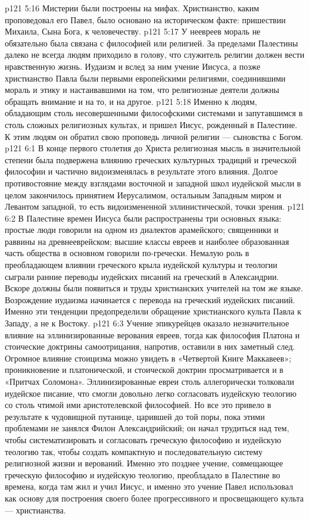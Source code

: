 \vs p121 5:16 \pc {}\bibnobreakspace Мистерии были построены на мифах. Христианство, каким проповедовал его Павел, было основано на историческом факте: пришествии Михаила, Сына Бога, к человечеству.
\vs p121 5:17 \pc У неевреев мораль не обязательно была связана с философией или религией. За пределами Палестины далеко не всегда людям приходило в голову, что служитель религии должен вести нравственную жизнь. Иудаизм и вслед за ним учение Иисуса, а позже христианство Павла были первыми европейскими религиями, соединившими мораль и этику и настаивавшими на том, что религиозные деятели должны обращать внимание и на то, и на другое.
\vs p121 5:18 Именно к людям, обладающим столь несовершенными философскими системами и запутавшимся в столь сложных религиозных культах, и пришел Иисус, рожденный в Палестине. К этим людям он обратил свою проповедь личной религии --- сыновства с Богом.
\vs p121 6:1 В конце первого столетия до Христа религиозная мысль в значительной степени была подвержена влиянию греческих культурных традиций и греческой философии и частично видоизменялась в результате этого влияния. Долгое противостояние между взглядами восточной и западной школ иудейской мысли в целом закончилось принятием Иерусалимом, остальным Западным миром и Левантом западной, то есть видоизмененной эллинистической, точки зрения.
\vs p121 6:2 В Палестине времен Иисуса были распространены три основных языка: простые люди говорили на одном из диалектов арамейского; священники и раввины на древнееврейском; высшие классы евреев и наиболее образованная часть общества в основном говорили по\hyp{}гречески. Немалую роль в преобладающем влиянии греческого крыла иудейской культуры и теологии сыграли ранние переводы иудейских писаний на греческий в Александрии. Вскоре должны были появиться и труды христианских учителей на том же языке. Возрождение иудаизма начинается с перевода на греческий иудейских писаний. Именно эти тенденции предопределили обращение христианского культа Павла к Западу, а не к Востоку.
\vs p121 6:3 Учение эпикурейцев оказало незначительное влияние на эллинизированные верования евреев, тогда как философия Платона и стоические доктрины самоотрицания, напротив, оставили в них заметный след. Огромное влияние стоицизма можно увидеть в «Четвертой Книге Маккавеев»; проникновение и платонической, и стоической доктрин просматривается и в «Притчах Соломона». Эллинизированные евреи столь аллегорически толковали иудейское писание, что смогли довольно легко согласовать иудейскую теологию со столь чтимой ими аристотелевской философией. Но все это привело в результате к чудовищной путанице, царившей до той поры, пока этими проблемами не занялся Филон Александрийский; он начал трудиться над тем, чтобы систематизировать и согласовать греческую философию и иудейскую теологию так, чтобы создать компактную и последовательную систему религиозной жизни и верований. Именно это позднее учение, совмещающее греческую философию и иудейскую теологию, преобладало в Палестине во времена, когда там жил и учил Иисус, и именно это учение Павел использовал как основу для построения своего более прогрессивного и просвещающего культа --- христианства.
